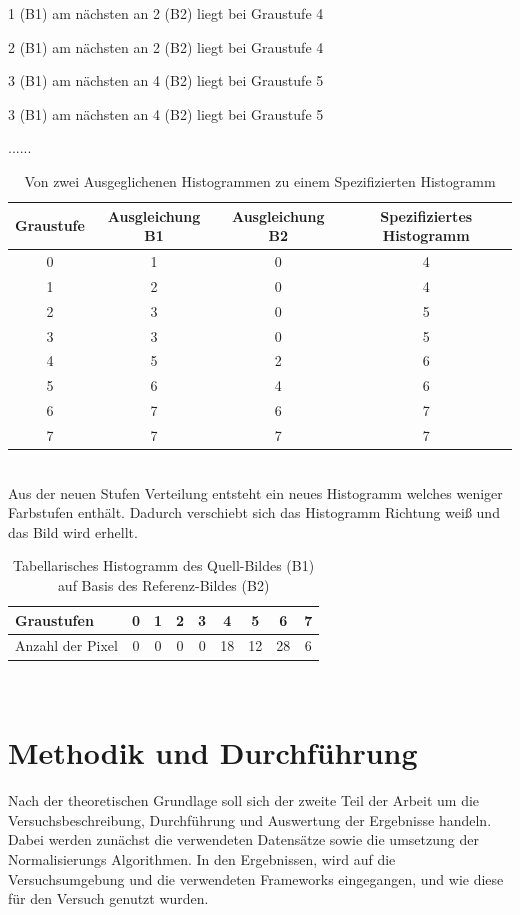 \documentclass[a4paper,12pt,oneside]{article}
\begin{document}
  1 (B1) am nächsten an 2 (B2) liegt bei Graustufe 4
  
  2 (B1) am nächsten an 2 (B2) liegt bei Graustufe 4
  
  3 (B1) am nächsten an 4 (B2) liegt bei Graustufe 5
  
  3 (B1) am nächsten an 4 (B2) liegt bei Graustufe 5
  
  ......\\
  \begin{table}
  [h]
  \caption{Von zwei Ausgeglichenen Histogrammen zu einem Spezifizierten Histogramm}
  \label{tab:hs}
  \centering
  \begin{tabular}{|c|c|c|c|}
  \hline
  Graustufe & Ausgleichung B1 & Ausgleichung B2 & Spezifiziertes Histogramm\\
  \hline
  0 & 1 & 0 & 4\\
  \hline
  1 & 2 & 0 & 4\\
  \hline
  2 & 3 & 0 & 5\\
  \hline
  3 & 3 & 0 & 5\\
  \hline
  4 & 5 & 2 & 6\\
  \hline
  5 & 6 & 4 & 6\\
  \hline
  6 & 7 & 6 & 7\\
  \hline
  7 & 7 & 7 & 7\\
  \hline
  \end{tabular}
  \end{table}\\
  Aus der neuen Stufen Verteilung entsteht ein neues Histogramm welches weniger Farbstufen enthält. Dadurch verschiebt sich das Histogramm Richtung weiß und das Bild wird erhellt.
  \begin{table}
  [h]
  \caption{Tabellarisches Histogramm des Quell-Bildes (B1) auf Basis des Referenz-Bildes (B2)}
  \centering
  \begin{tabular}{|l|c|c|c|c|c|c|c|c|}
  \hline
  Graustufen & 0 & 1 & 2 & 3 & 4 & 5 & 6 & 7\\
  \hline
  Anzahl der Pixel & 0 & 0 & 0 & 0 & 18 & 12 & 28 & 6\\
  \hline
  \end{tabular}
  \end{table}\\

\newpage
  \section{Methodik und Durchführung}\label{s.methudurchf}
Nach der theoretischen Grundlage soll sich der zweite Teil der Arbeit um die Versuchsbeschreibung, Durchführung und Auswertung der Ergebnisse handeln. Dabei werden zunächst die verwendeten Datensätze sowie die umsetzung der Normalisierungs Algorithmen. In den Ergebnissen, wird auf die Versuchsumgebung und die verwendeten Frameworks eingegangen, und wie diese für den Versuch genutzt wurden.
\end{document}
